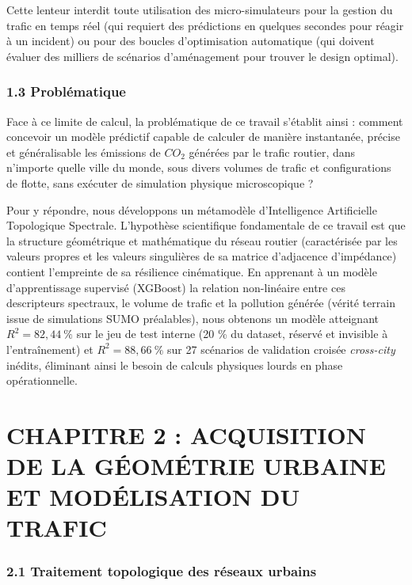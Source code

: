 \documentclass[10pt, a4paper]{article}
\begin{document}
Cette lenteur interdit toute utilisation des micro-simulateurs pour la
gestion du trafic en temps réel (qui requiert des prédictions en
quelques secondes pour réagir à un incident) ou pour des boucles
d'optimisation automatique (qui doivent évaluer des milliers de
scénarios d'aménagement pour trouver le design optimal).

\subsubsection{1.3 Problématique}\label{probluxe9matique}

Face à ce limite de calcul, la problématique de ce travail s'établit
ainsi : comment concevoir un modèle prédictif capable de calculer de
manière instantanée, précise et généralisable les émissions de \(CO_2\)
générées par le trafic routier, dans n'importe quelle ville du monde,
sous divers volumes de trafic et configurations de flotte, sans exécuter
de simulation physique microscopique ?

Pour y répondre, nous développons un métamodèle d'Intelligence
Artificielle Topologique Spectrale. L'hypothèse scientifique
fondamentale de ce travail est que la structure géométrique et
mathématique du réseau routier (caractérisée par les valeurs propres et
les valeurs singulières de sa matrice d'adjacence d'impédance) contient
l'empreinte de sa résilience cinématique. En apprenant à un modèle
d'apprentissage supervisé (XGBoost) la relation non-linéaire entre ces
descripteurs spectraux, le volume de trafic et la pollution générée
(vérité terrain issue de simulations SUMO préalables), nous obtenons un
modèle atteignant \(R^2 = 82{,}44\ \%\) sur le jeu de test interne (20
\% du dataset, réservé et invisible à l'entraînement) et
\(R^2 = 88{,}66\ \%\) sur 27 scénarios de validation croisée
\emph{cross-city} inédits, éliminant ainsi le besoin de calculs
physiques lourds en phase opérationnelle.

\newpage

\section{CHAPITRE 2 : ACQUISITION DE LA GÉOMÉTRIE URBAINE ET
MODÉLISATION DU
TRAFIC}\label{chapitre-2-acquisition-de-la-guxe9omuxe9trie-urbaine-et-moduxe9lisation-du-trafic}

\subsubsection{2.1 Traitement topologique des réseaux
urbains}\label{traitement-topologique-des-ruxe9seaux-urbains}
\end{document}
